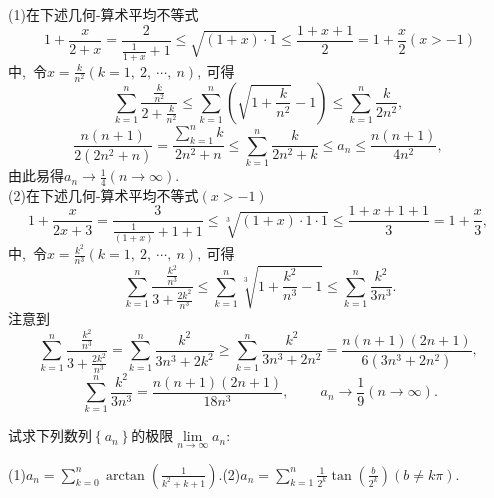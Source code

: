 	\begin{solution}
		(1)在下述几何-算术平均不等式
		$$1+\frac{x}{2+x}=\frac{2}{\frac{1}{1+x}+1}\le\sqrt{(1+x)\cdot 1}\le\frac{1+x+1}{2}=1+\frac{x}{2}(x>-1)$$
		中,\ 令$x=\frac{k}{n^2}(k=1,\ 2,\ \cdots,\ n),\ $可得
		$$\sum\limits_{k=1}^{n}\frac{\frac{k}{n^2}}{2+\frac{k}{n^2}}\le\sum\limits_{k=1}^{n}\left(\sqrt{1+\frac{k}{n^2}}-1\right)\le\sum\limits_{k=1}^{n}\frac{k}{2n^2},\ $$
		$$\frac{n(n+1)}{2(2n^2+n)}=\frac{\sum\limits_{k=1}^{n}k}{2n^2+n}\le\sum\limits_{k=1}^{n}\frac{k}{2n^2+k}\le a_n\le \frac{n(n+1)}{4n^2},\ $$
		由此易得$a_n\rightarrow\frac{1}{4}(n\rightarrow\infty).$\\
		(2)在下述几何-算术平均不等式$(x>-1)$
		$$1+\frac{x}{2x+3}=\frac{3}{\frac{1}{(1+x)}+1+1}\le\sqrt[3]{(1+x)\cdot1\cdot1}\le\frac{1+x+1+1}{3}=1+\frac{x}{3},\ $$
		中,\ 令$x=\frac{k^2}{n^3}(k=1,\ 2,\ \cdots,\ n),\ $可得
		$$\sum\limits_{k=1}^{n}\frac{\frac{k^2}{n^3}}{3+\frac{2k^2}{n^3}}\le\sum\limits_{k=1}^{n}\sqrt[3]{1+\frac{k^2}{n^3}-1}\le\sum\limits_{k=1}^{n}\frac{k^2}{3n^3}.$$
		注意到
		$$\sum\limits_{k=1}^{n}\frac{\frac{k^2}{n^3}}{3+\frac{2k^2}{n^3}}=\sum\limits_{k=1}^{n}\frac{k^2}{3n^3+2k^2}\ge\sum\limits_{k=1}^{n}\frac{k^2}{3n^3+2n^2}=\frac{n(n+1)(2n+1)}{6(3n^3+2n^2)},\ $$
		$$\sum\limits_{k=1}^{n}\frac{k^2}{3n^3}=\frac{n(n+1)(2n+1)}{18n^3},\ \qquad a_n\rightarrow\frac{1}{9}(n\rightarrow\infty).$$ 
	\end{solution}
	\newpage
	\begin{problem}
		试求下列数列$\left\{a_n\right\}$的极限$\lim\limits_{n\rightarrow\infty}a_n:$
		
		(1)$a_n=\sum\limits_{k=0}^{n}\arctan\left(\frac{1}{k^2+k+1}\right).$\qquad(2)$a_n=\sum\limits_{k=1}^{n}\frac{1}{2^k}\tan\left(\frac{b}{2^k}\right)(b\neq k\pi).$
	\end{problem}
	
